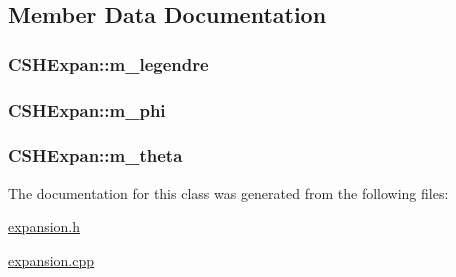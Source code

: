 \subsection{Member Data Documentation}
\hypertarget{classCSHExpan_aa1762978841609a0e44e0a67ab8c14ae}{
\subsubsection[{m\-\_\-legendre}]{ C\-S\-H\-Expan\-::m\-\_\-legendre}}\label{classCSHExpan_aa1762978841609a0e44e0a67ab8c14ae}
\hypertarget{classCSHExpan_a57187dc86ecba1c73324e1305715cc63}{
\subsubsection[{m\-\_\-phi}]{ C\-S\-H\-Expan\-::m\-\_\-phi\hspace{0.3cm}{\ttfamily [protected]}}}\label{classCSHExpan_a57187dc86ecba1c73324e1305715cc63}
\hypertarget{classCSHExpan_acd0e3ac848f0196a389d66124601cc39}{
\subsubsection[{m\-\_\-theta}]{ C\-S\-H\-Expan\-::m\-\_\-theta\hspace{0.3cm}{\ttfamily [protected]}}}\label{classCSHExpan_acd0e3ac848f0196a389d66124601cc39}


The documentation for this class was generated from the following files\-:\begin{DoxyCompactItemize}
\item 
\hyperlink{expansion_8h}{expansion.\-h}\item 
\hyperlink{expansion_8cpp}{expansion.\-cpp}\end{DoxyCompactItemize}
